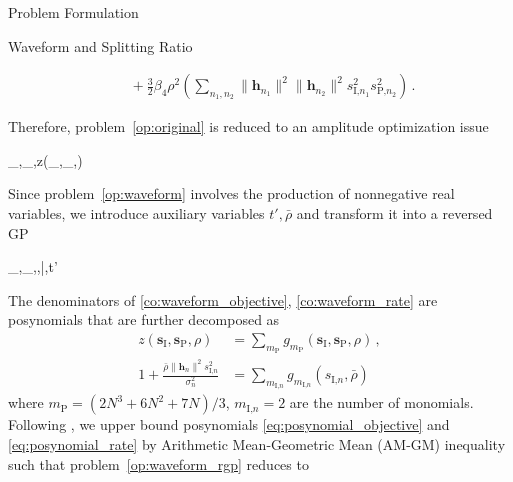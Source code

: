 \documentclass[journal]{IEEEtran}
\begin{document}
\begin{section}{Problem Formulation}
\begin{subsection}{Waveform and Splitting Ratio}
\begin{figure*}[b]
\begin{align}
					& \quad + \frac{3}{2}{\beta_4}{\rho^2} \left( \sum_{n_1,n_2} \lVert{\boldsymbol{h}_{n_1}}\rVert^2 \lVert{\boldsymbol{h}_{n_2}}\rVert^2 s_{\text{I,}{n_1}}^2 s_{\text{P,}{n_2}}^2 \right)\,.\label{eq:z_waveform}
				\end{align}
			\end{figure*}%
			Therefore, problem~\eqref{op:original} is reduced to an amplitude optimization issue
			\begin{maxi!}
				{_{},_,\rho}{z(_{},_,\rho)}{\label{op:waveform}}{}
			\end{maxi!}
			Since problem~\eqref{op:waveform} involves the production of nonnegative real variables, we introduce auxiliary variables $t',\bar{\rho}$ and transform it into a reversed GP
			\begin{mini!}
				{_{},_,\rho,\bar{\rho},t'}{}{\label{op:waveform_rgp}}{}
				\label{co:waveform_power}
				\label{co:waveform_objective}
				\label{co:waveform_rate}
			\end{mini!}
			The denominators of \eqref{co:waveform_objective}, \eqref{co:waveform_rate} are posynomials \cite{Boyd2007} that are further decomposed as
			\begin{align}
				z(\boldsymbol{s}_{\text{I}},\boldsymbol{s}_\text{P},\rho)&=\sum_{m_\text{P}}{g_{m_\text{P}}(\boldsymbol{s}_{\text{I}},\boldsymbol{s}_\text{P},\rho)}\label{eq:posynomial_objective}\,,\\
				1+\frac{\bar{\rho}\lVert{\boldsymbol{h}_n}\rVert^2 s_{\text{I,}n}^2}{\sigma_n^2}&=\sum_{m_{\text{I,}n}}g_{m_{\text{I,}n}}(s_{\text{I,}n},\bar{\rho})\label{eq:posynomial_rate}
			\end{align}
			where $m_\text{P}=(2N^3+6N^2+7N)/3$, $m_{\text{I,}n}=2$ are the number of monomials. Following \cite{Chiang2005}, we upper bound posynomials \eqref{eq:posynomial_objective} and \eqref{eq:posynomial_rate} by Arithmetic Mean-Geometric Mean (AM-GM) inequality such that problem~\eqref{op:waveform_rgp} reduces to

\end{subsection}
\end{section}
\end{document}
